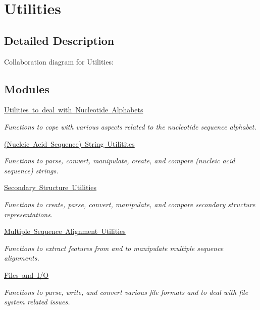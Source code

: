 \hypertarget{group__utils}{}\section{Utilities}
\label{group__utils}


\subsection{Detailed Description}
Collaboration diagram for Utilities\+:
\subsection*{Modules}
\begin{DoxyCompactItemize}
\item 
\mbox{\hyperlink{group__alphabet__utils}{Utilities to deal with Nucleotide Alphabets}}
\begin{DoxyCompactList}\small\item\em Functions to cope with various aspects related to the nucleotide sequence alphabet. \end{DoxyCompactList}\item 
\mbox{\hyperlink{group__string__utils}{(\+Nucleic Acid Sequence) String Utilitites}}
\begin{DoxyCompactList}\small\item\em Functions to parse, convert, manipulate, create, and compare (nucleic acid sequence) strings. \end{DoxyCompactList}\item 
\mbox{\hyperlink{group__struct__utils}{Secondary Structure Utilities}}
\begin{DoxyCompactList}\small\item\em Functions to create, parse, convert, manipulate, and compare secondary structure representations. \end{DoxyCompactList}\item 
\mbox{\hyperlink{group__aln__utils}{Multiple Sequence Alignment Utilities}}
\begin{DoxyCompactList}\small\item\em Functions to extract features from and to manipulate multiple sequence alignments. \end{DoxyCompactList}\item 
\mbox{\hyperlink{group__file__utils}{Files and I/O}}
\begin{DoxyCompactList}\small\item\em Functions to parse, write, and convert various file formats and to deal with file system related issues. \end{DoxyCompactList}\item 

\end{DoxyCompactItemize}
